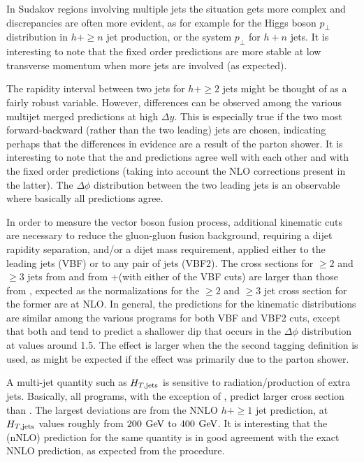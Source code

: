 In Sudakov regions involving multiple jets the situation gets more complex
and discrepancies are often more evident, as for example for the 
Higgs boson $p_\perp$ distribution in $h+\ge n$ jet production, or the 
system $p_\perp$ for $h+n$ jets. It is interesting to note that the fixed 
order predictions are more stable at low transverse momentum when more 
jets are involved (as expected). 

The rapidity interval between two jets for $h+\ge2$ jets might be thought 
of as a fairly robust variable. However, differences can be observed among 
the various multijet merged predictions at high $\Delta y$. This is especially true 
if the two most forward-backward (rather than the two leading) jets are 
chosen, indicating perhaps that the differences in evidence are a result 
of the parton shower. It is interesting to note that the \hjetscompPowheg \hjetscompNNLOPS 
and \hjetscompSherpa \hjetscompNNLOPS predictions agree well with each other and with the 
fixed order predictions (taking into account the NLO corrections present 
in the latter). The $\Delta \phi$ distribution between the two leading 
jets is an observable where basically all predictions agree. 

In order to measure the vector boson fusion process, additional kinematic 
cuts are necessary to reduce the gluon-gluon fusion background, requiring 
a dijet rapidity separation, and/or a dijet mass requirement, applied 
either to the leading jets (VBF) or to any pair of 
jets (VBF2). The cross sections for $\ge2$ and $\ge3$ jets from \hjetscompSherpa 
\hjetscompMEPSatNLO and from \hjetscompGoSam{}+\hjetscompSherpa (with either of the VBF cuts) are larger than 
those from \hjetscompPowheg \hjetscompNNLOPS, expected as the normalizations for the $\ge2$ 
and $\ge3$ jet cross section for the former are at NLO. In general, the 
predictions for the kinematic distributions are similar among the various 
programs for both VBF and VBF2 cuts, except that both \hjetscompSherpa \hjetscompMEPSatNLO and 
\hjetscompSherpa \hjetscompNNLOPS tend to predict a shallower dip that occurs in the $\Delta \phi$ 
distribution at values around 1.5. The effect is larger when the 
the second tagging definition is used, as might be expected if the effect was 
primarily due to the parton shower. 

A multi-jet quantity such as $H_{T, {\rm jets}}$ is sensitive to 
radiation/production of extra jets. Basically, all programs, with the 
exception of \hjetscompHerwig, predict larger cross section than \hjetscompPowheg \hjetscompNNLOPS. 
The largest deviations are from the NNLO  $h+\ge1$ jet prediction, at 
$H_{T, {\rm jets}}$ values roughly from $200\,\text{\:GeV}$ to $400\,\text{\:GeV}$. 
It is interesting that the \hjetscompLoopsim (nNLO) prediction for the same quantity 
is in good agreement with the exact NNLO prediction, as expected from the 
\hjetscompLoopsim procedure.

